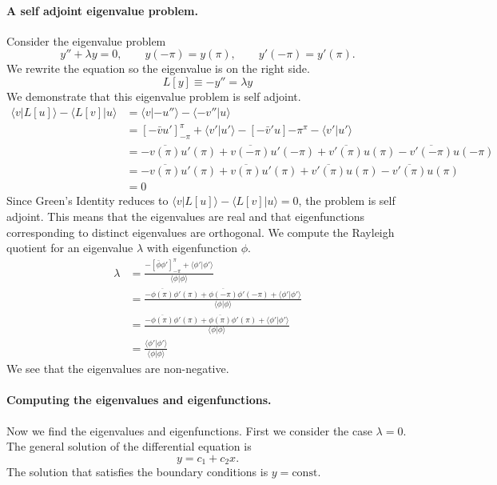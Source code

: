 \paragraph{A self adjoint eigenvalue problem.}
Consider the eigenvalue problem
\[ 
y'' + \lambda y = 0, \qquad y(-\pi) = y(\pi), \qquad y'(-\pi) = y'(\pi).
\]
We rewrite the equation so the eigenvalue is on the right side.
\[
L[y] \equiv - y'' = \lambda y
\]
We demonstrate that this eigenvalue problem is self adjoint.
\begin{align*}
  \langle v | L[u] \rangle - \langle L[v] | u \rangle 
  &= \langle v | -u'' \rangle - \langle - v'' | u \rangle 
  \\
  &= [ - \bar{v} u' ]_{-\pi}^\pi + \langle v' | u' \rangle - [ - \bar{v}' u ]{-\pi}^\pi - \langle v' | u' \rangle 
  \\
  &= - \overline{v(\pi)} u'(\pi) + \overline{v(-\pi)} u'(-\pi) 
  + \overline{v'(\pi)} u(\pi) - \overline{v'(-\pi)} u(-\pi) 
  \\
  &= - \overline{v(\pi)} u'(\pi) + \overline{v(\pi)} u'(\pi) 
  + \overline{v'(\pi)} u(\pi) - \overline{v'(\pi)} u(\pi) 
  \\
  &= 0
\end{align*}
Since Green's Identity reduces to $\langle v | L[u] \rangle - \langle L[v] | u \rangle = 0$, the 
problem is self adjoint.  This means that the eigenvalues are real 
and that eigenfunctions corresponding to distinct eigenvalues are orthogonal.
We compute the Rayleigh quotient for an eigenvalue $\lambda$ with eigenfunction $\phi$.
\begin{align*}
  \lambda &= \frac{ - [ \bar{\phi} \phi' ]_{-\pi}^\pi + \langle \phi' | \phi' \rangle }{ \langle \phi | \phi \rangle }
  \\
  &= \frac{ - \overline{\phi(\pi)} \phi'(\pi) + \overline{\phi(-\pi)} \phi'(-\pi) 
    + \langle \phi' | \phi' \rangle }{ \langle \phi | \phi \rangle }
  \\
  &= \frac{ - \overline{\phi(\pi)} \phi'(\pi) + \overline{\phi(\pi)} \phi'(\pi) 
    + \langle \phi' | \phi' \rangle }{ \langle \phi | \phi \rangle }
  \\
  &= \frac{ \langle \phi' | \phi' \rangle }{ \langle \phi | \phi \rangle }
\end{align*}
We see that the eigenvalues are non-negative.


\paragraph{Computing the eigenvalues and eigenfunctions.}
Now we find the eigenvalues and eigenfunctions.
First we consider the case $\lambda = 0$.  The general solution of the 
differential equation is
\[ 
y = c_1 + c_2 x.
\]
The solution that satisfies the boundary conditions is $y = \mathrm{const}$.


